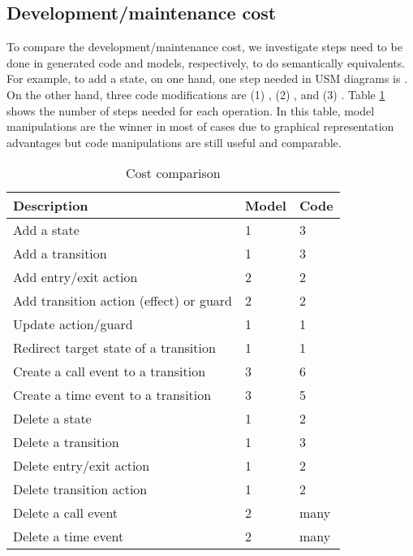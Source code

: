 \subsection{Development/maintenance cost}
\label{subsec:cost}
To compare the development/maintenance cost, we investigate steps need to be done in generated code and models, respectively, to do semantically equivalents. For example, to add a state, on one hand, one step needed in USM diagrams is . On the other hand, three code modifications are (1) , (2) , and (3) . Table \ref{table:cost} shows the number of steps needed for each operation. In this table, model manipulations are the winner in most of cases due to graphical representation advantages but code manipulations are still useful and comparable.

\begin{table}
\centering
\caption{Cost comparison}
\label{table:cost}
\begin{tabular}{|l|l|l|}
\hline
\rowcolor{Gray}
Description                                     & Model & Code \\ \hline
Add a state                                     & 1     & 3    \\ \hline
Add a transition                                & 1     & 3    \\ \hline
Add entry/exit action                           & 2     & 2    \\ \hline
Add transition action (effect) or guard                           & 2     & 2    \\ \hline
Update action/guard                                   & 1     & 1    \\ \hline
Redirect target state of a transition           & 1     & 1    \\ \hline
Create a call event to a transition & 3     & 6    \\ \hline
Create a time event to a transition & 3     & 5    \\ \hline
Delete a state                                  & 1     & 2    \\ \hline
Delete a transition                             & 1     & 3    \\ \hline
Delete entry/exit action                        & 1     & 2    \\ \hline
Delete transition action                        & 1     & 2    \\ \hline
Delete a call event                             & 2     & many \\ \hline
Delete a time event                             & 2     & many \\ \hline
\end{tabular}
\end{table}

